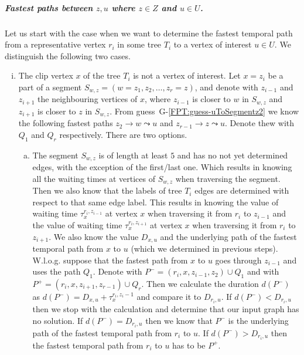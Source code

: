 \documentclass[a4paper,UKenglish,cleveref, autoref, thm-restate, anonymous]{lipics-v2021}
\begin{document}
\subparagraph{\boldmath Fastest paths between $z,u$ where $z \in Z$ and $u \in U$.}
Let us start with the case when we want to determine the fastest temporal path from a representative vertex $r_i$ in some tree $T_i$ to a vertex of interest $u \in U$.
We distinguish the following two cases.
\begin{enumerate}[(i)]
    \item \label{FPT:z-u-clipnotU}
    The clip vertex $x$ of the tree $T_i$ is not a vertex of interest.
    Let $x = z_i$ be a part of a segment $S_{w,z} = (w = z_1, z_2, \dots, z_r = z)$, and denote with $z_{i-1}$ and $z_{i+1}$ the neighbouring vertices of $x$, 
    where $z_{i-1}$ is closer to $w$ in $S_{w,z}$ and 
    $z_{i+1}$ is closer to $z$ in $S_{w,z}$.
    From guess~G-\ref{FPT:guess-uToSegmentz2} we know the following fastest paths $z_{2} \rightarrow w \leadsto u$ and %
    $z_{r-1} \rightarrow z \leadsto u$.
    Denote thew with $Q_1$ and $Q_r$ respectively.
    There are two options.
    \begin{enumerate}[(a)]
        \item The segment $S_{w,z}$ is of length at least $5$ and has no not yet determined edges, with the exception of the first/last one.
        Which results in knowing all the waiting times at vertices of $S_{w,z}$ when traversing the segment.
        Then we also know that the labels of tree $T_i$ edges are determined with respect to that same edge label.
        This results in knowing the value of waiting time
        $\tau_x^{r_i,z_{i-1}}$ at vertex $x$ when traversing it from $r_i$ to $z_{i-1}$ and 
        the value of waiting time $\tau_x^{r_i,z_{i+1}}$ at vertex $x$
        when traversing it from $r_i$ to $z_{i+1}$.
        We also know the value $D_{x,u}$ and the underlying path of the fastest temporal path from $x$ to $u$ (which we determined in previous steps).
        W.l.o.g. suppose that the fastest path from $x$ to $u$ goes through $z_{i-1}$ and uses the path $Q_1$.
        Denote with $P^{-} = (r_i, x, z_{i-1}, z_2) \cup Q_1$
        and with $P^{+} = (r_i, x, z_{i+1}, z_{r-1}) \cup Q_r$.
        Then we calculate the duration $d(P^{-})$ as $d(P^{-}) = D_{x,u} + \tau_x^{r_i,z_i-1}$
        and compare it to $D_{r_i,u}$.
        If $d(P^{-}) < D_{r_i,u} $ then we stop with the calculation and determine that our input graph has no solution.
        If $d(P^{-}) = D_{r_i,u} $ then we know that $P^{-}$ is the underlying path of the fastest temporal path from $r_i$ to $u$. 
        If $d(P^{-}) > D_{r_i,u} $ then the fastest temporal path from $r_i$ to $u$ has to be $P^{+}$.

\end{enumerate}
\end{enumerate}
\end{document}
